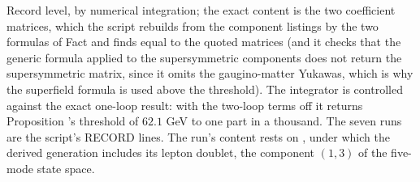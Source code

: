 Record level, by numerical integration; the exact content is the two coefficient matrices, which the script rebuilds from the component listings by the two formulas of Fact  and finds equal to the quoted matrices (and it checks that the generic formula applied to the supersymmetric components does not return the supersymmetric matrix, since it omits the gaugino-matter Yukawas, which is why the superfield formula is used above the threshold). The integrator is controlled against the exact one-loop result: with the two-loop terms off it returns Proposition 's threshold of $62.1$ GeV to one part in a thousand. The seven runs are the script's RECORD lines. The run's content rests on , under which the derived generation includes its lepton doublet, the component $(1,3)$ of the five-mode state space.

